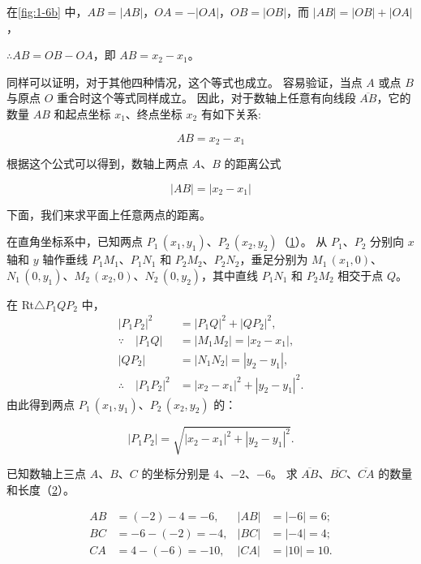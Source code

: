 在\cref{fig:1-6b} 中，$AB=|AB|$，$OA=-|OA|$，$OB=|OB|$，而 $|AB|=|OB|+|OA|$，

$\therefore AB=OB-OA$，即 $AB=x_2-x_1$。

同样可以证明，对于其他四种情况，这个等式也成立。
容易验证，当点 $A$ 或点 $B$ 与原点 $O$ 重合时这个等式同样成立。
因此，对于数轴上任意有向线段 $\overline{AB}$，它的数量 $AB$ 和起点坐标 $x_1$、终点坐标 $x_2$ 有如下关系:

\[ AB = x_2 - x_1 \]

根据这个公式可以得到，数轴上两点 $A$、$B$ 的距离公式

\[ |AB| = |x_2 - x_1| \]

下面，我们来求平面上任意两点的距离。

在直角坐标系中，已知两点 $P_1\,(x_1,y_1)$、$P_2\,(x_2,y_2)$（\cref{fig:1-7}）。
从 $P_1$、$P_2$ 分别向 $x$ 轴和 $y$ 轴作垂线 $P_1M_1$、$P_1N_1$ 和 $P_2M_2$、$P_2N_2$，垂足分别为 $M_1\,(x_1,0)$、$N_1\,(0,y_1)$、$M_2\,(x_2,0)$、$N_2\,(0,y_2)$，其中直线 $P_1N_1$ 和 $P_2M_2$ 相交于点 $Q$。
\begin{figure}
  \caption{}\label{fig:1-7}
\end{figure}

在 Rt$\triangle P_1QP_2$ 中，
\begin{align*}
  |P_1P_2|^2 & = |P_1Q|^2+|QP_2|^2,\\
  \because \quad |P_1Q| &= |M_1M_2|=|x_2-x_1|,\\
  |QP_2| & = |N_1N_2|=|y_2-y_1|,\\
  \therefore \quad |P_1P_2|^2 &= |x_2-x_1|^2+|y_2-y_1|^2.
\end{align*}
由此得到两点 $P_1\,(x_1,y_1)$、$P_2\,(x_2,y_2)$ 的：

\[ |P_1P_2| = \sqrt{|x_2-x_1|^2+|y_2-y_1|^2}. \]

\begin{example}
已知数轴上三点 $A$、$B$、$C$ 的坐标分别是 $4$、$-2$、$-6$。
求 $\overline{AB}$、$\overline{BC}$、$\overline{CA}$ 的数量和长度（\cref{fig:1-8}）。
\end{example}
\begin{figure}
  \caption{}\label{fig:1-8}
\end{figure}
\begin{solution}
  \begin{align*}
    AB & = (-2)-4=-6,   & |AB| &=|-6|=6;\\
    BC & = -6-(-2)=-4,  & |BC| &=|-4|=4;\\
    CA & = 4-(-6)=-10,  & |CA| &=|10|=10.
  \end{align*}
\end{solution}

